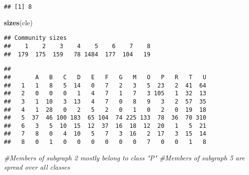 \documentclass[
]{article}
\newenvironment{Shaded}{\begin{snugshade}}{\end{snugshade}}
\newcommand{\CommentTok}[1]{\textcolor[rgb]{0.56,0.35,0.01}{\textit{#1}}}
\newcommand{\DataTypeTok}[1]{\textcolor[rgb]{0.13,0.29,0.53}{#1}}
\newcommand{\KeywordTok}[1]{\textcolor[rgb]{0.13,0.29,0.53}{\textbf{#1}}}
\newcommand{\NormalTok}[1]{#1}
\newcommand{\OperatorTok}[1]{\textcolor[rgb]{0.81,0.36,0.00}{\textbf{#1}}}
\begin{document}
\begin{verbatim}
## [1] 8
\end{verbatim}

\begin{Shaded}
\begin{Highlighting}[]
\KeywordTok{sizes}\NormalTok{(cle)               }
\end{Highlighting}
\end{Shaded}

\begin{verbatim}
## Community sizes
##    1    2    3    4    5    6    7    8 
##  179  175  159   78 1484  177  104   19
\end{verbatim}

\begin{Shaded}
\end{Shaded}

\begin{verbatim}
##    
##       A   B   C   D   E   F   G   M   O   P   R   T   U
##   1   1   8   5  14   0   7   2   3   5  23   2  41  64
##   2   0   0   0   1   4   7   1   7   3 105   1  32  13
##   3   1  10   3  13   4   7   0   8   9   3   2  57  35
##   4   1  28   0   2   5   2   0   1   0   2   0  19  18
##   5  37  46 100 183  65 104  74 225 133  78  36  70 310
##   6   3   5  10  15  12  37  16  18  12  20   1   5  21
##   7   8   0   4  10   5   7   3  16   2  17   3  15  14
##   8   0   1   0   0   0   0   0   0   7   0   0   1   8
\end{verbatim}

\begin{Shaded}
\begin{Highlighting}[]
\CommentTok{#Members of subgraph 2 mostly belong to class "P"}
\CommentTok{#Members of subgraph 5 are spread over all classes}
\end{Highlighting}
\end{Shaded}
\end{document}
